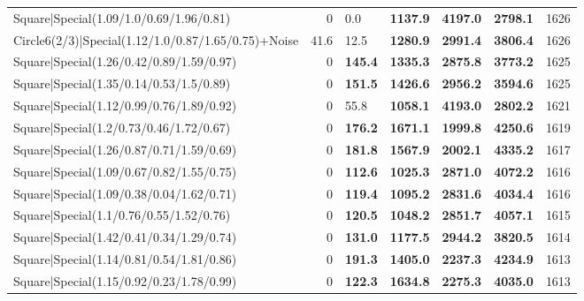 \begin{tabular}{lrllllr}
 Square|Special(1.09/1.0/0.69/1.96/0.81)                       &             0   & 0.0            & \textbf{1137.9} & \textbf{4197.0} & \textbf{2798.1} &         1626 \\
 Circle6(2/3)|Special(1.12/1.0/0.87/1.65/0.75)+Noise           &            41.6 & 12.5           & \textbf{1280.9} & \textbf{2991.4} & \textbf{3806.4} &         1626 \\
 Square|Special(1.26/0.42/0.89/1.59/0.97)                      &             0   & \textbf{145.4} & \textbf{1335.3} & \textbf{2875.8} & \textbf{3773.2} &         1625 \\
 Square|Special(1.35/0.14/0.53/1.5/0.89)                       &             0   & \textbf{151.5} & \textbf{1426.6} & \textbf{2956.2} & \textbf{3594.6} &         1625 \\
 Square|Special(1.12/0.99/0.76/1.89/0.92)                      &             0   & 55.8           & \textbf{1058.1} & \textbf{4193.0} & \textbf{2802.2} &         1621 \\
 Square|Special(1.2/0.73/0.46/1.72/0.67)                       &             0   & \textbf{176.2} & \textbf{1671.1} & \textbf{1999.8} & \textbf{4250.6} &         1619 \\
 Square|Special(1.26/0.87/0.71/1.59/0.69)                      &             0   & \textbf{181.8} & \textbf{1567.9} & \textbf{2002.1} & \textbf{4335.2} &         1617 \\
 Square|Special(1.09/0.67/0.82/1.55/0.75)                      &             0   & \textbf{112.6} & \textbf{1025.3} & \textbf{2871.0} & \textbf{4072.2} &         1616 \\
 Square|Special(1.09/0.38/0.04/1.62/0.71)                      &             0   & \textbf{119.4} & \textbf{1095.2} & \textbf{2831.6} & \textbf{4034.4} &         1616 \\
 Square|Special(1.1/0.76/0.55/1.52/0.76)                       &             0   & \textbf{120.5} & \textbf{1048.2} & \textbf{2851.7} & \textbf{4057.1} &         1615 \\
 Square|Special(1.42/0.41/0.34/1.29/0.74)                      &             0   & \textbf{131.0} & \textbf{1177.5} & \textbf{2944.2} & \textbf{3820.5} &         1614 \\
 Square|Special(1.14/0.81/0.54/1.81/0.86)                      &             0   & \textbf{191.3} & \textbf{1405.0} & \textbf{2237.3} & \textbf{4234.9} &         1613 \\
 Square|Special(1.15/0.92/0.23/1.78/0.99)                      &             0   & \textbf{122.3} & \textbf{1634.8} & \textbf{2275.3} & \textbf{4035.0} &         1613 \\

\end{tabular}
